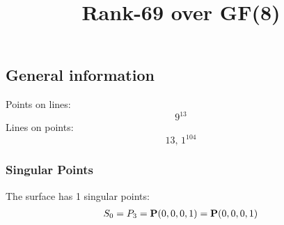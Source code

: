 \documentclass{article}
\newcommand\setTBstruts{\def\T{\rule{0pt}{2.6ex}}%
\def\B{\rule[-1.2ex]{0pt}{0pt}}}
\newcommand{\bP}{{\bf P}}
\begin{document}
 
\setTBstruts



{\allowdisplaybreaks%






\title{Rank-69 over GF(8)}
\author{}%
\maketitle%
%
{}



\subsection*{General information}
Points on lines:
$$
9^{13}$$
Lines on points:
$$
13,\,1^{104}$$
\subsubsection*{Singular Points}
The surface has 1 singular points:\\
\begin{align*}
S_{0} &= P_{3}=\bP(0, 0, 0, 1) = \bP(0, 0, 0, 1)\\
\end{align*}
}
\end{document}
